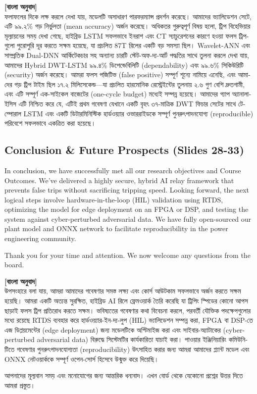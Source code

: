 \documentclass[12pt]{article}
\begin{document}
\begin{bengali}
\textbf{[বাংলা অনুবাদ]} \\
ফলাফলের দিকে লক্ষ করলে দেখা যায়, মডেলটি অসাধারণ পারফরম্যান্স প্রদর্শন করেছে। আমাদের ভ্যালিডেশন সেটে, এটি ৯৯.২\% গড় নির্ভুলতা (mean accuracy) অর্জন করেছে। অধিকতর গুরুত্বপূর্ণ বিষয় হলো, ট্রিপ বিহেভিয়ার মূল্যায়নের সময় দেখা গেছে, হাইব্রিড LSTM সফলভাবে ইনরাশ এবং CT স্যাচুরেশনের কারণে হওয়া ফলস ট্রিপগুলো পুরোপুরি দূর করতে সক্ষম হয়েছে, যা প্রচলিত 87T রিলের একটি বড় সমস্যা ছিল। Wavelet-ANN এবং সাম্প্রতিক Dual-DNN আর্কিটেকচার সহ অন্যান্য চারটি স্টেট-অফ-দ্য-আর্ট পদ্ধতির সাথে তুলনা করলে দেখা যায়, আমাদের Hybrid DWT-LSTM ৯৯.৪\% ডিপেন্ডেবিলিটি (dependability) এবং ৯৯.৬\% সিকিউরিটি (security) অর্জন করেছে। আমরা ফলস পজিটিভ (false positive) সম্পূর্ণ শূন্যে নামিয়ে এনেছি, এবং আমাদের গড় ট্রিপ টাইম ছিল ১৭.২ মিলিসেকেন্ড—যা প্রচলিত হারমোনিক রেস্ট্রেইন্টের তুলনায় ২.৬ গুণ বেশি দ্রুতগামী, এবং এটি সম্পূর্ণ এক-সাইকেল বাজেটের (one-cycle budget) মধ্যেই সম্পন্ন হয়েছে। আমাদের গ্যাপ অ্যানালাইসিস এটি নিশ্চিত করে যে, এটিই প্রথম গবেষণা যেখানে একটি বৃহৎ ৩৭-মাত্রিক DWT ফিচার সেটের সাথে টেম্পোরাল LSTM এবং একটি ডিটারমিনিস্টিক হার্ডওয়্যার ওভাররাইডকে সম্পূর্ণ পুনরুৎপাদনযোগ্য (reproducible) পরিবেশে সফলভাবে একত্রিত করা হয়েছে।
\end{bengali}

\subsection*{Conclusion \& Future Prospects (Slides 28-33)}
In conclusion, we have successfully met all our research objectives and Course Outcomes. We've delivered a highly secure, hybrid AI relay framework that prevents false trips without sacrificing tripping speed. Looking forward, the next logical steps involve hardware-in-the-loop (HIL) validation using RTDS, optimizing the model for edge deployment on an FPGA or DSP, and testing the system against cyber-perturbed adversarial data. We have fully open-sourced our plant model and ONNX network to facilitate reproducibility in the power engineering community.

Thank you for your time and attention. We now welcome any questions from the board.

\begin{bengali}
\textbf{[বাংলা অনুবাদ]} \\
উপসংহারে বলা যায়, আমরা আমাদের গবেষণার সমস্ত লক্ষ্য এবং কোর্স আউটকাম সফলভাবে অর্জন করতে সক্ষম হয়েছি। আমরা একটি অত্যন্ত সুরক্ষিত, হাইব্রিড AI রিলে ফ্রেমওয়ার্ক তৈরি করেছি যা ট্রিপিং স্পিডের কোনো আপস ছাড়াই ফলস ট্রিপ প্রতিরোধ করতে সক্ষম। ভবিষ্যতের গবেষণার কথা বিবেচনা করলে, পরবর্তী যৌক্তিক পদক্ষেপগুলোর মধ্যে রয়েছে RTDS ব্যবহার করে হার্ডওয়্যার-ইন-দ্য-লুপ (HIL) ভ্যালিডেশন সম্পন্ন করা, FPGA বা DSP-তে এজ ডিপ্লয়মেন্টের (edge deployment) জন্য মডেলটিকে অপ্টিমাইজ করা এবং সাইবার-অ্যাটাকের (cyber-perturbed adversarial data) বিরুদ্ধে সিস্টেমটির কার্যকারিতা যাচাই করা। পাওয়ার ইঞ্জিনিয়ারিং কমিউনিটিতে গবেষণার পুনরুৎপাদনযোগ্যতা (reproducibility) উৎসাহিত করার জন্য আমরা আমাদের প্ল্যান্ট মডেল এবং ONNX নেটওয়ার্ককে সম্পূর্ণ ওপেন-সোর্স হিসেবে উন্মুক্ত করে দিয়েছি।

আপনাদের মূল্যবান সময় এবং মনোযোগের জন্য আন্তরিক ধন্যবাদ। এখন বোর্ড থেকে যেকোনো প্রশ্নের উত্তর দিতে আমরা প্রস্তুত।
\end{bengali}
\end{document}

